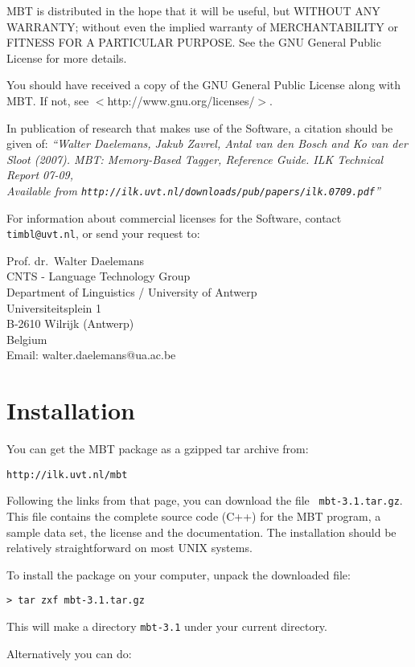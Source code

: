 \documentclass{report}
\begin{document}
MBT is distributed in the hope that it will be useful, but WITHOUT
ANY WARRANTY; without even the implied warranty of MERCHANTABILITY or
FITNESS FOR A PARTICULAR PURPOSE.  See the GNU General Public License
for more details.

You should have received a copy of the GNU General Public License
along with MBT.  If not, see $<$http://www.gnu.org/licenses/$>$.

In publication of research that makes use of the Software, a
citation should be given of: {\em ``Walter Daelemans, Jakub Zavrel,
Antal van den Bosch and Ko van der Sloot (2007). MBT: Memory-Based
Tagger, Reference Guide. ILK Technical Report 07-09, \\
Available from
{\tt http://ilk.uvt.nl/downloads/pub/papers/ilk.0709.pdf}''}

For information about commercial licenses for the Software,
contact {\tt timbl@uvt.nl}, or send your request to:

Prof. dr.~Walter Daelemans\\
CNTS - Language Technology Group\\
Department of Linguistics / University of Antwerp\\
Universiteitsplein 1\\
B-2610 Wilrijk (Antwerp)\\
Belgium\\
Email: walter.daelemans@ua.ac.be

\pagestyle{headings}

\chapter{Installation}
\vspace{-1cm}
You can get the MBT package as a gzipped tar archive from:

{\tt http://ilk.uvt.nl/mbt}

Following the links from that page, you can download the file {\tt
  mbt-3.1.tar.gz}. This file contains the complete source code (C++)
for the MBT program, a sample data set, the license and the
documentation.
The installation should be relatively straightforward on most UNIX systems.

To install the package on your computer, unpack the downloaded file:

{\tt > tar zxf mbt-3.1.tar.gz}

This will make a directory {\tt mbt-3.1} under your current directory.

Alternatively you can do:
\end{document}
